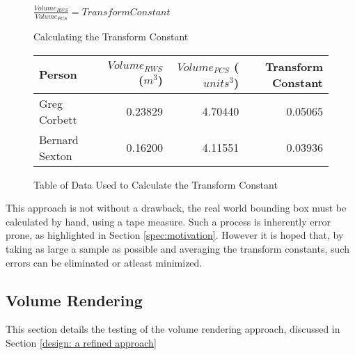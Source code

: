 \begin{figure}[h]
\begin{center}
$\frac{Volume_{RWS}}{Volume_{PCS}} = Transform Constant$
\end{center}
\caption{Calculating the Transform Constant}
\label{testing: calculating the transform constant}
\end{figure}
\begin{figure}[h]
\begin{center}
  \begin{tabular}{| l | r | r | r |}
    \hline
    Person & $Volume_{RWS}$ ($m^3$) & $Volume_{PCS}$ ($units^3$) & Transform Constant \\ \hline
    Greg Corbett 	& 0.23829 & 4.70440 & 0.05065\\ \hline
    Bernard Sexton 	& 0.16200 & 4.11551 & 0.03936\\ \hline
  \end{tabular}
\end{center}
\caption{Table of Data Used to Calculate the Transform Constant}
\label{testing: table of data used to calculate the transform constant}
\end{figure}

This approach is not without a drawback, the real world bounding box must be calculated by hand, using a tape measure. Such a process is inherently error prone, as highlighted in Section \ref{spec:motivation}. However it is hoped that, by taking as large a sample as possible and averaging the transform constants, such errors can be eliminated or atleast minimized.\\

\subsection{Volume Rendering}
\label{testing: volume rendering}
This section details the testing of the volume rendering approach, discussed in Section \ref{design: a refined approach}